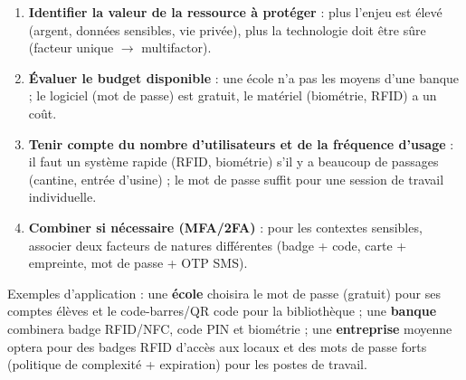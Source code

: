 \documentclass[11pt]{article}
\begin{document}
\begin{methode}
\begin{enumerate}
  \item \textbf{Identifier la valeur de la ressource à protéger} : plus l'enjeu est élevé (argent, données sensibles, vie privée), plus la technologie doit être sûre (facteur unique $\to$ multifactor).
  \item \textbf{Évaluer le budget disponible} : une école n'a pas les moyens d'une banque ; le logiciel (mot de passe) est gratuit, le matériel (biométrie, RFID) a un coût.
  \item \textbf{Tenir compte du nombre d'utilisateurs et de la fréquence d'usage} : il faut un système rapide (RFID, biométrie) s'il y a beaucoup de passages (cantine, entrée d'usine) ; le mot de passe suffit pour une session de travail individuelle.
  \item \textbf{Combiner si nécessaire (MFA/2FA)} : pour les contextes sensibles, associer deux facteurs de natures différentes (badge + code, carte + empreinte, mot de passe + OTP SMS).
\end{enumerate}
Exemples d'application : une \textbf{école} choisira le mot de passe (gratuit) pour ses comptes élèves et le code-barres/QR code pour la bibliothèque ; une \textbf{banque} combinera badge RFID/NFC, code PIN et biométrie ; une \textbf{entreprise} moyenne optera pour des badges RFID d'accès aux locaux et des mots de passe forts (politique de complexité + expiration) pour les postes de travail.
\end{methode}
\end{document}
